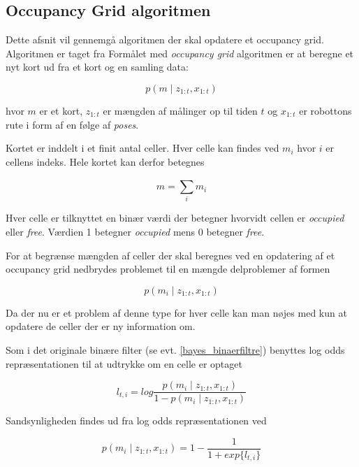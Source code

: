 \subsection{Occupancy Grid algoritmen}
Dette afsnit vil gennemgå algoritmen der skal opdatere et occupancy grid.
Algoritmen er taget fra \cite[p.~xxx]{probabilisticRobotics}
Formålet med \textit{occupancy grid} algoritmen er at beregne	et nyt kort ud fra et kort og en samling data:

\begin{equation}
p(m \mid z_{1:t}, x_{1:t})
\end{equation}

hvor $m$ er et kort, $ z_{1:t} $ er mængden af målinger op til tiden $t$ og $ x_{1:t} $ er robottons rute i form af en følge af \textit{poses}.

Kortet er inddelt i et finit antal celler.
Hver celle kan findes ved $ m_i $ hvor $i$ er cellens indeks. 
Hele kortet kan derfor betegnes

\begin{equation}
m = \sum_{i}^{} m_i 
\end{equation}

Hver celle er tilknyttet en binær værdi der betegner hvorvidt cellen er \textit{occupied} eller \textit{free}.
Værdien 1 betegner \textit{occupied} mens 0 betegner \textit{free}.

For at begrænse mængden af celler der skal beregnes ved en opdatering af et occupancy grid nedbrydes problemet til en mængde delproblemer af formen

\begin{equation}
p(m_i \mid z_{1:t}, x_{1:t})
\end{equation} 

Da der nu er et problem af denne type for hver celle kan man nøjes med kun at opdatere de celler der er ny information om.

Som i det originale binære filter (se evt. \cref{bayes_binaerfiltre}) benyttes log odds repræsentationen til at udtrykke om en celle er optaget

\begin{equation}
l_{t,i} = log{ \frac{p(m_i \mid z_{1:t}, x_{1:t})}{1 - p(m_i \mid z_{1:t}, x_{1:t})}} 
\end{equation} 

Sandsynligheden findes ud fra log odds repræsentationen ved

\begin{equation}
p(m_i \mid z_{1:t}, x_{1:t}) = 1 - \frac{1}{1 + exp \{ l_{t,i} \} }
\end{equation} 

